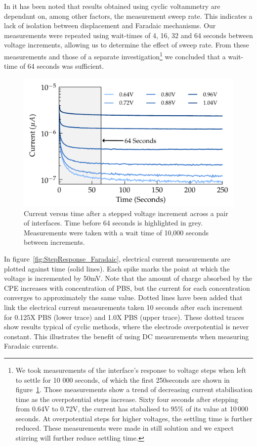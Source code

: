 \documentclass[journal, a4paper]{IEEEtran}
\begin{document}
In \cite{Cogan2008} it has been noted that results obtained using cyclic voltammetry are dependant on, among other factors, the measurement sweep rate. This indicates a lack of isolation between displacement and Faradaic mechanisms. Our measurements were repeated using wait-times of 4, 16, 32 and 64 seconds between voltage increments, allowing us to determine the effect of sweep rate. From these measurements and those of a separate investigation\footnote{We took measurements of the interface's response to voltage steps when left to settle for 10 000 seconds, of which the first 250\thinspace seconds are shown in figure~\ref{fig:CPE_currentVsTime}. Those measurements show a trend of decreasing current stabilisation time as the overpotential steps increase. Sixty four seconds after stepping from 0.64\thinspace V to 0.72\thinspace V, the current has stabalised to $95\%$ of its value at 10\,000 seconds. At overpotential steps for higher voltages, the settling time is further reduced. These measurements were made in still solution and we expect stirring will further reduce settling time.} we concluded that a wait-time of 64 seconds was sufficient.
\begin{figure}
    \begin{center}
        \includegraphics{graphics/CPE_currentVsTime}
    \end{center}
    \caption{Current versus time after a stepped voltage increment across a pair of interfaces. Time before 64 seconds is highlighted in grey. Measurements were taken with a wait time of 10,000 seconds between increments.}
    \label{fig:CPE_currentVsTime}
\end{figure}

In figure~\ref{fig:StepResponse_Faradaic}, electrical current measurements are plotted against time (solid lines). Each spike marks the point at which the voltage is incremented by 50\thinspace mV. Note that the amount of charge absorbed by the CPE increases with concentration of PBS, but the current for each concentration converges to approximately the same value. Dotted lines have been added that link the electrical current measurements taken 10 seconds after each increment for 0.125X PBS (lower trace) and 1.0X PBS (upper trace). These dotted traces show results typical of cyclic methods, where the electrode overpotential is never constant. This illustrates the benefit of using DC measurements when measuring Faradaic currents.
\end{document}
